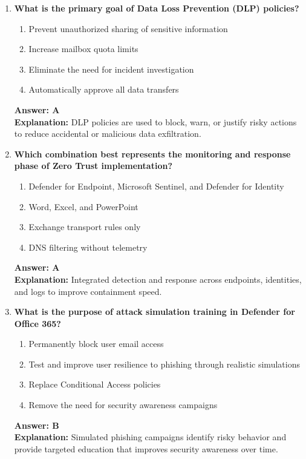 \documentclass[10pt]{article}
\begin{document}
\begin{enumerate}[leftmargin=*]
\item \textbf{What is the primary goal of Data Loss Prevention (DLP) policies?}
\begin{enumerate}[label=\Alph*.]
  \item Prevent unauthorized sharing of sensitive information
  \item Increase mailbox quota limits
  \item Eliminate the need for incident investigation
  \item Automatically approve all data transfers
\end{enumerate}
\textbf{Answer: A}\\
\textbf{Explanation:} DLP policies are used to block, warn, or justify risky actions to reduce accidental or malicious data exfiltration.

\item \textbf{Which combination best represents the monitoring and response phase of Zero Trust implementation?}
\begin{enumerate}[label=\Alph*.]
  \item Defender for Endpoint, Microsoft Sentinel, and Defender for Identity
  \item Word, Excel, and PowerPoint
  \item Exchange transport rules only
  \item DNS filtering without telemetry
\end{enumerate}
\textbf{Answer: A}\\
\textbf{Explanation:} Integrated detection and response across endpoints, identities, and logs to improve containment speed.

\item \textbf{What is the purpose of attack simulation training in Defender for Office 365?}
\begin{enumerate}[label=\Alph*.]
  \item Permanently block user email access
  \item Test and improve user resilience to phishing through realistic simulations
  \item Replace Conditional Access policies
  \item Remove the need for security awareness campaigns
\end{enumerate}
\textbf{Answer: B}\\
\textbf{Explanation:} Simulated phishing campaigns identify risky behavior and provide targeted education that improves security awareness over time.

\end{enumerate}
\clearpage
\end{document}
